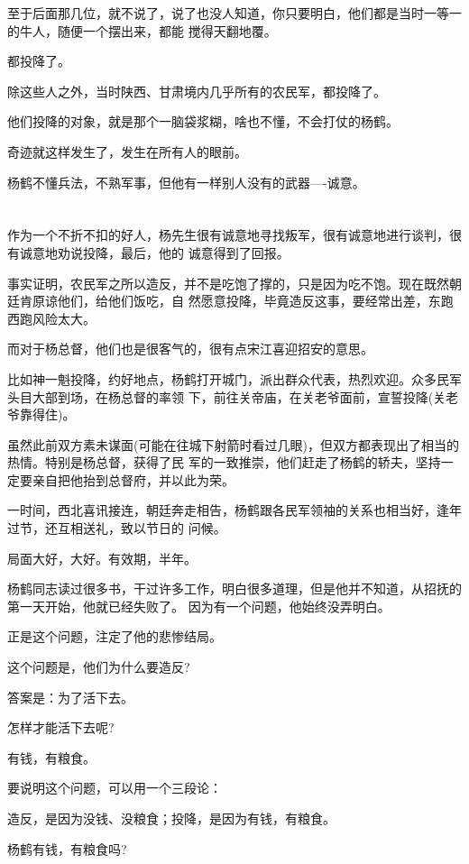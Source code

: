 \documentclass[11pt,a4paper,onecolumn]{article}
\begin{document}
至于后面那几位，就不说了，说了也没人知道，你只要明白，他们都是当时一等一的牛人，随便一个摆出来，都能
搅得天翻地覆。

都投降了。

除这些人之外，当时陕西、甘肃境内几乎所有的农民军，都投降了。

他们投降的对象，就是那个一脑袋浆糊，啥也不懂，不会打仗的杨鹤。

奇迹就这样发生了，发生在所有人的眼前。

杨鹤不懂兵法，不熟军事，但他有一样别人没有的武器----诚意。

\section[\thesection]{}

作为一个不折不扣的好人，杨先生很有诚意地寻找叛军，很有诚意地进行谈判，很有诚意地劝说投降，最后，他的
诚意得到了回报。

事实证明，农民军之所以造反，并不是吃饱了撑的，只是因为吃不饱。现在既然朝廷肯原谅他们，给他们饭吃，自
然愿意投降，毕竟造反这事，要经常出差，东跑西跑风险太大。

而对于杨总督，他们也是很客气的，很有点宋江喜迎招安的意思。

比如神一魁投降，约好地点，杨鹤打开城门，派出群众代表，热烈欢迎。众多民军头目大部到场，在杨总督的率领
下，前往关帝庙，在关老爷面前，宣誓投降(关老爷靠得住)。

虽然此前双方素未谋面(可能在往城下射箭时看过几眼)，但双方都表现出了相当的热情。特别是杨总督，获得了民
军的一致推崇，他们赶走了杨鹤的轿夫，坚持一定要亲自把他抬到总督府，并以此为荣。

一时间，西北喜讯接连，朝廷奔走相告，杨鹤跟各民军领袖的关系也相当好，逢年过节，还互相送礼，致以节日的
问候。

局面大好，大好。有效期，半年。

杨鹤同志读过很多书，干过许多工作，明白很多道理，但是他并不知道，从招抚的第一天开始，他就已经失败了。
因为有一个问题，他始终没弄明白。

正是这个问题，注定了他的悲惨结局。

这个问题是，他们为什么要造反?

答案是：为了活下去。

怎样才能活下去呢?

有钱，有粮食。

要说明这个问题，可以用一个三段论：

造反，是因为没钱、没粮食；投降，是因为有钱，有粮食。

杨鹤有钱，有粮食吗?
\end{document}
